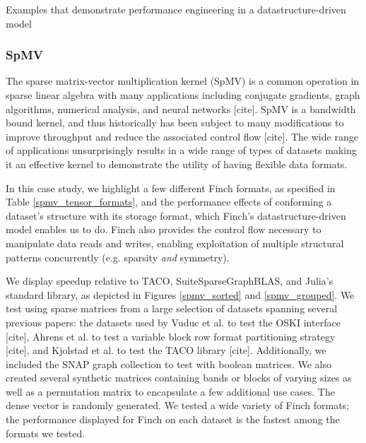 Examples that demonstrate performance engineering in a datastructure-driven model

\subsubsection{SpMV}
The sparse matrix-vector multiplication kernel (SpMV) is a common operation in sparse linear algebra with many applications including conjugate gradients, graph algorithms, numerical analysis, and neural networks [cite]. SpMV is a bandwidth bound kernel, and thus historically has been subject to many modifications to improve throughput and reduce the associated control flow [cite]. The wide range of applications unsurprisingly results in a wide range of types of datasets making it an effective kernel to demonstrate the utility of having flexible data formats. 

In this case study, we highlight a few different Finch formats, as specified in Table \ref{spmv_tensor_formats}, and the performance effects of conforming a dataset’s structure with its storage format, which Finch's datastructure-driven model enables us to do. Finch also provides the control flow necessary to manipulate data reads and writes, enabling exploitation of multiple structural patterns concurrently (e.g. sparsity \textit{and} symmetry). 


We display speedup relative to TACO, SuiteSparseGraphBLAS, and Julia’s standard library, as depicted in Figures \ref{spmv_sorted} and \ref{spmv_grouped}.  We test using sparse matrices from a large selection of datasets spanning several previous papers: the datasets used by Vuduc et al. to test the OSKI interface [cite], Ahrens et al. to test a variable block row format partitioning strategy [cite], and Kjolstad et al. to test the TACO library [cite]. Additionally, we included the SNAP graph collection to test with boolean matrices. We also created several synthetic matrices containing bands or blocks of varying sizes as well as a permutation matrix to encapsulate a few additional use cases. The dense vector is randomly generated. We tested a wide variety of Finch formats; the performance displayed for Finch on each dataset is the fastest among the formats we tested.

